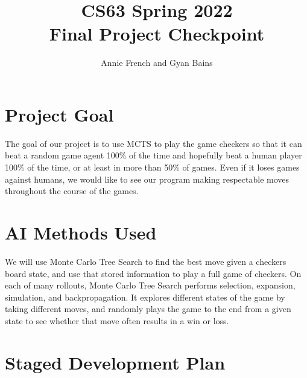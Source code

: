 \documentclass[11pt]{article}
\title{CS63 Spring 2022\\Final Project Checkpoint}
\author{Annie French and Gyan Bains}
\date{}
\begin{document}
\maketitle

\section{Project Goal}



The goal of our project is to use MCTS to play the game checkers so that it can beat a random game agent 100\% of the time and hopefully beat a human player 100\% of the time, or at least in more than 50\% of games. Even if it loses games against humans, we would like to see our program making respectable moves throughout the course of the games.

\section{AI Methods Used}


We will use Monte Carlo Tree Search to find the best move given a checkers board state, and use that stored information to play a full game of checkers. On each of many rollouts, Monte Carlo Tree Search performs selection, expansion, simulation, and backpropagation. It explores different states of the game by taking different moves, and randomly plays the game to the end from a given state to see whether that move often results in a win or loss. 

\section{Staged Development Plan}


\end{document}
